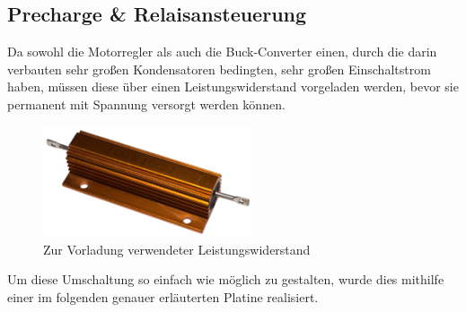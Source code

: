 \newpage
\subsection{Precharge \& Relaisansteuerung}
Da sowohl die Motorregler als auch die Buck-Converter einen, durch die darin verbauten sehr großen Kondensatoren bedingten, sehr großen Einschaltstrom haben, 
müssen diese über einen Leistungswiderstand vorgeladen werden, bevor sie permanent mit Spannung versorgt werden können.\\
\begin{figure}[h]
    \centering
    \includegraphics[width=0.55\textwidth]{Fotos/Leistungswiderstand.png}
    \caption{Zur Vorladung verwendeter Leistungswiderstand}
\end{figure}

Um diese Umschaltung so einfach wie möglich zu gestalten, wurde dies mithilfe einer im folgenden genauer erläuterten Platine realisiert. 

